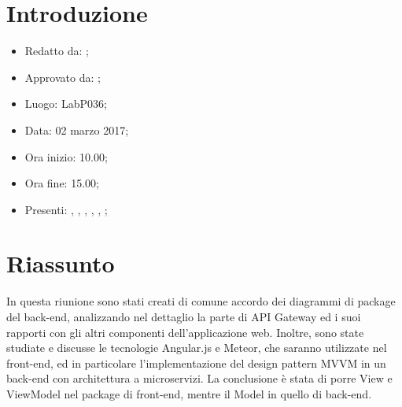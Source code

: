 \section{Introduzione}

	\begin{itemize}
		\item Redatto da: \MC;
		\item Approvato da: \AS;
		\item Luogo: LabP036;
		\item Data: 02 marzo 2017;
		\item Ora inizio: 10.00;
		\item Ora fine: 15.00;
		\item Presenti: \AN, \AS, \DAN, \DS, \MC, \NS;	
	\end{itemize}

\section{Riassunto}
In questa riunione sono stati creati di comune accordo dei diagrammi di package del back-end, analizzando nel dettaglio la parte di API Gateway ed i suoi rapporti con gli altri componenti dell'applicazione web. Inoltre, sono state studiate e discusse le tecnologie Angular.js e Meteor, che saranno utilizzate nel front-end, ed in particolare l'implementazione del design pattern MVVM in un back-end con architettura a microservizi. La conclusione è stata di porre View e ViewModel nel package di front-end, mentre il Model in quello di back-end.